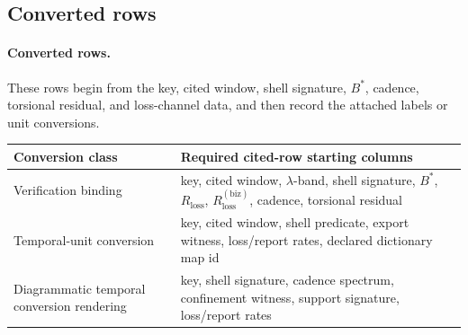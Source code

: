 \subsection{Converted rows}\label{app:realworld-routing}
\paragraph{Converted rows.} These rows begin from the key, cited window, shell signature, $B^*$, cadence, torsional residual, and loss-channel data, and then record the attached labels or unit conversions.

\begin{center}
\begin{tabularx}{\linewidth}{@{}lX@{}}
\toprule
Conversion class & Required cited-row starting columns \\
\midrule
Verification binding & key, cited window, $\lambda$-band, shell signature, $B^*$, $R_{\mathrm{loss}}$, $R^{(\mathrm{biz})}_{\mathrm{loss}}$, cadence, torsional residual \\
Temporal-unit conversion & key, cited window, shell predicate, export witness, loss/report rates, declared dictionary map id \\
Diagrammatic temporal conversion rendering & key, shell signature, cadence spectrum, confinement witness, support signature, loss/report rates \\
\bottomrule
\end{tabularx}
\end{center}
